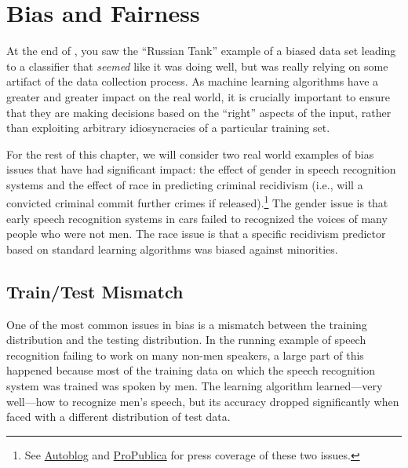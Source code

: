 \chapter{Bias and Fairness} \label{sec:bias}


\begin{learningobjectives}
\item
\end{learningobjectives}




At the end of , you saw the ``Russian Tank'' example of a biased data set leading to a classifier that \emph{seemed} like it was doing well, but was really relying on some artifact of the data collection process.
As machine learning algorithms have a greater and greater impact on the real world, it is crucially important to ensure that they are making decisions based on the ``right'' aspects of the input, rather than exploiting arbitrary idiosyncracies of a particular training set.

For the rest of this chapter, we will consider two real world examples of bias issues that have had significant impact: the effect of gender in speech recognition systems and the effect of race in predicting criminal recidivism (i.e., will a convicted criminal commit further crimes if released).\footnote{See \href{http://www.autoblog.com/2011/05/31/women-voice-command-systems/}{Autoblog} and \href{http://www.propublica.org/article/machine-bias-risk-assessments-in-criminal-sentencing}{ProPublica} for press coverage of these two issues.} The gender issue is that early speech recognition systems in cars failed to recognized the voices of many people who were not men. The race issue is that a specific recidivism predictor based on standard learning algorithms was biased against minorities.

\section{Train/Test Mismatch}

One of the most common issues in bias is a mismatch between the training distribution and the testing distribution.
In the running example of speech recognition failing to work on many non-men speakers, a large part of this happened because most of the training data on which the speech recognition system was trained was spoken by men.
The learning algorithm learned---very well---how to recognize men's speech, but its accuracy dropped significantly when faced with a different distribution of test data.

